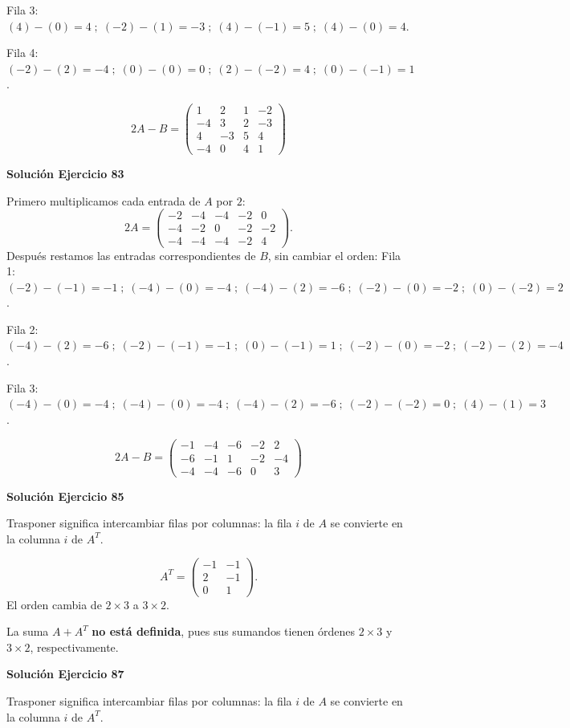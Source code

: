 \documentclass[12pt]{article}
\begin{document}
Fila 3: $(4)-(0)=4\; ;\; (-2)-(1)=-3\; ;\; (4)-(-1)=5\; ;\; (4)-(0)=4$.

Fila 4: $(-2)-(2)=-4\; ;\; (0)-(0)=0\; ;\; (2)-(-2)=4\; ;\; (0)-(-1)=1$.

\[
\boxed{2A-B=\begin{pmatrix}1&2&1&-2\\-4&3&2&-3\\4&-3&5&4\\-4&0&4&1\end{pmatrix}}
\]

\par\bigskip\noindent\textbf{Solución Ejercicio 83}\par\nobreak
Primero multiplicamos cada entrada de $A$ por $2$:
\[
2A=\begin{pmatrix}-2&-4&-4&-2&0\\-4&-2&0&-2&-2\\-4&-4&-4&-2&4\end{pmatrix}.
\]
Después restamos las entradas correspondientes de $B$, sin cambiar el orden:
Fila 1: $(-2)-(-1)=-1\; ;\; (-4)-(0)=-4\; ;\; (-4)-(2)=-6\; ;\; (-2)-(0)=-2\; ;\; (0)-(-2)=2$.

Fila 2: $(-4)-(2)=-6\; ;\; (-2)-(-1)=-1\; ;\; (0)-(-1)=1\; ;\; (-2)-(0)=-2\; ;\; (-2)-(2)=-4$.

Fila 3: $(-4)-(0)=-4\; ;\; (-4)-(0)=-4\; ;\; (-4)-(2)=-6\; ;\; (-2)-(-2)=0\; ;\; (4)-(1)=3$.

\[
\boxed{2A-B=\begin{pmatrix}-1&-4&-6&-2&2\\-6&-1&1&-2&-4\\-4&-4&-6&0&3\end{pmatrix}}
\]

\par\bigskip\noindent\textbf{Solución Ejercicio 85}\par\nobreak
Trasponer significa intercambiar filas por columnas: la fila $i$ de $A$ se convierte en la columna $i$ de $A^T$.

\[
A^T=\begin{pmatrix}-1&-1\\2&-1\\0&1\end{pmatrix}.
\]
El orden cambia de $2\times3$ a $3\times2$.

La suma $A+A^T$ \textbf{no está definida}, pues sus sumandos tienen órdenes $2\times3$ y $3\times2$, respectivamente.


\par\bigskip\noindent\textbf{Solución Ejercicio 87}\par\nobreak
Trasponer significa intercambiar filas por columnas: la fila $i$ de $A$ se convierte en la columna $i$ de $A^T$.
\end{document}
